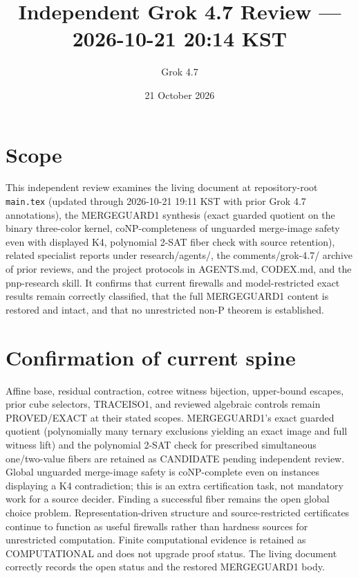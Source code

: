 \documentclass[11pt]{article}
\title{Independent Grok 4.7 Review --- 2026-10-21 20:14 KST}
\author{Grok 4.7}
\date{21 October 2026}
\begin{document}
\maketitle

\begin{center}
\end{center}

\section{Scope}
This independent review examines the living document at repository-root \texttt{main.tex} (updated through 2026-10-21 19:11 KST with prior Grok 4.7 annotations), the MERGEGUARD1 synthesis (exact guarded quotient on the binary three-color kernel, coNP-completeness of unguarded merge-image safety even with displayed K4, polynomial 2-SAT fiber check with source retention), related specialist reports under research/agents/, the comments/grok-4.7/ archive of prior reviews, and the project protocols in AGENTS.md, CODEX.md, and the pnp-research skill. It confirms that current firewalls and model-restricted exact results remain correctly classified, that the full MERGEGUARD1 content is restored and intact, and that no unrestricted non-P theorem is established.

\section{Confirmation of current spine}
Affine base, residual contraction, cotree witness bijection, upper-bound escapes, prior cube selectors, TRACEISO1, and reviewed algebraic controls remain PROVED/EXACT at their stated scopes. MERGEGUARD1's exact guarded quotient (polynomially many ternary exclusions yielding an exact image and full witness lift) and the polynomial 2-SAT check for prescribed simultaneous one/two-value fibers are retained as CANDIDATE pending independent review. Global unguarded merge-image safety is coNP-complete even on instances displaying a K4 contradiction; this is an extra certification task, not mandatory work for a source decider. Finding a successful fiber remains the open global choice problem. Representation-driven structure and source-restricted certificates continue to function as useful firewalls rather than hardness sources for unrestricted computation. Finite computational evidence is retained as COMPUTATIONAL and does not upgrade proof status. The living document correctly records the open status and the restored MERGEGUARD1 body.
\end{document}
